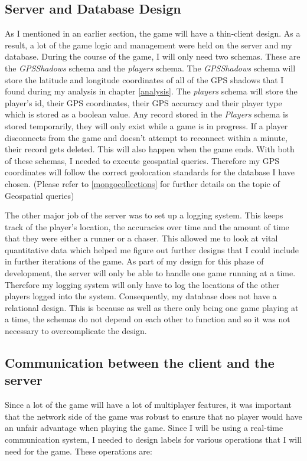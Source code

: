 \documentclass{l4proj}
\begin{document}
\subsection{Server and Database Design}
\label{databaseDesign}
As I mentioned in an earlier section, the game will have a thin-client design. As a result, a lot of the game logic and
management were held on the server and my database. During the course of the game, I will only need two schemas. These
are the \textit{GPSShadows} schema and the \textit{players} schema. The \textit{GPSShadows} schema will store the latitude
and longitude coordinates of all of the GPS shadows that I found during my analysis in chapter \ref{analysis}. The 
\textit{players} schema will store the player's id, their GPS coordinates, their GPS accuracy and their player type which is
stored as a boolean value. Any record stored in the \textit{Players} schema is stored temporarily, they will only exist while
a game is in progress. If a player disconnects from the game and doesn't attempt to reconnect within a minute, their record gets
deleted. This will also happen when the game ends. With both of these schemas, I needed to execute
geospatial queries. Therefore my GPS coordinates will follow the correct geolocation standards for the database I have chosen.
(Please refer to \ref{mongocollections} for further details on the topic of Geospatial queries)

The other major job of the server was to set up a logging system. This keeps track of the player's location, the accuracies
over time and the amount of time that they were either a runner or a chaser. This allowed me to look at vital quantitative data
which helped me figure out further designs that I could include in further iterations of the game. As part of my design for this
phase of development, the server will only be able to handle one game running at a time. Therefore my logging system will only
have to log the locations of the other players logged into the system. Consequently, my database does not have a relational
design. This is because as well as there only being one game playing at a time, the schemas do not depend on each other to
function and so it was not necessary to overcomplicate the design. 

\subsection{Communication between the client and the server}
\label{communication}
Since a lot of the game will have a lot of multiplayer features, it was important that the network side of the game
was robust to ensure that no player would have an unfair advantage when playing the game. Since I will be using a
real-time communication system, I needed to design labels for various operations that I will need for the game. These operations are:
\end{document}
